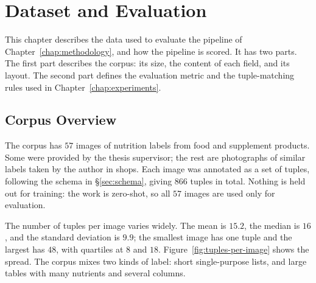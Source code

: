 %
%
%

\chapter{Dataset and Evaluation}\label{chap:evaluation}

This chapter describes the data used to evaluate the pipeline of
Chapter~\ref{chap:methodology}, and how the pipeline is scored. It has two
parts. The first part describes the corpus: its size, the content of each
field, and its layout. The second part defines the evaluation metric and
the tuple-matching rules used in Chapter~\ref{chap:experiments}.

\section{Corpus Overview}\label{sec:corpus}

The corpus has $57$ images of nutrition labels from food and supplement
products. Some were provided by the thesis supervisor; the rest are
photographs of similar labels taken by the author in shops. Each image was
annotated as a set of tuples, following the schema in \S\ref{sec:schema},
giving $866$ tuples in total. Nothing is held out for training: the work is
zero-shot, so all $57$ images are used only for evaluation.

The number of tuples per image varies widely. The mean is $15.2$, the
median is $16$, and the standard deviation is $9.9$; the smallest image has
one tuple and the largest has $48$, with quartiles at $8$ and $18$.
Figure~\ref{fig:tuples-per-image} shows the spread. The corpus mixes two
kinds of label: short single-purpose lists, and large tables with many
nutrients and several columns.

